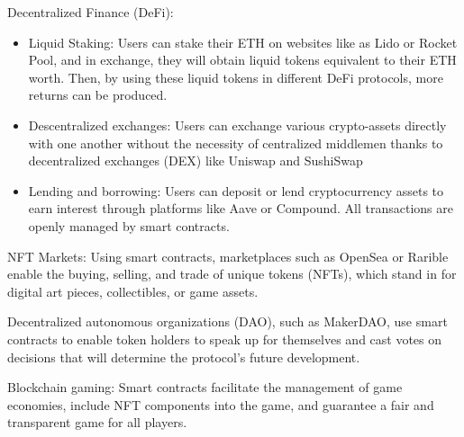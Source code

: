 Decentralized Finance (DeFi):
\begin{itemize}
	\item Liquid Staking: Users can stake their ETH on websites like as Lido or Rocket Pool, and in exchange, they will obtain liquid tokens equivalent to their ETH worth. Then, by using these liquid tokens in different DeFi protocols, more returns can be produced.
	\item Descentralized exchanges: Users can exchange various crypto-assets directly with one another without the necessity of centralized middlemen thanks to decentralized exchanges (DEX) like Uniswap and SushiSwap
	\item Lending and borrowing: Users can deposit or lend cryptocurrency assets to earn interest through platforms like Aave or Compound. All transactions are openly managed by smart contracts.
\end{itemize}

NFT Markets: Using smart contracts, marketplaces such as OpenSea or Rarible enable the buying, selling, and trade of unique tokens (NFTs), which stand in for digital art pieces, collectibles, or game assets.

 Decentralized autonomous organizations (DAO), such as MakerDAO, use smart contracts to enable token holders to speak up for themselves and cast votes on decisions that will determine the protocol's future development.
 
 Blockchain gaming: Smart contracts facilitate the management of game economies, include NFT components into the game, and guarantee a fair and transparent game for all players.